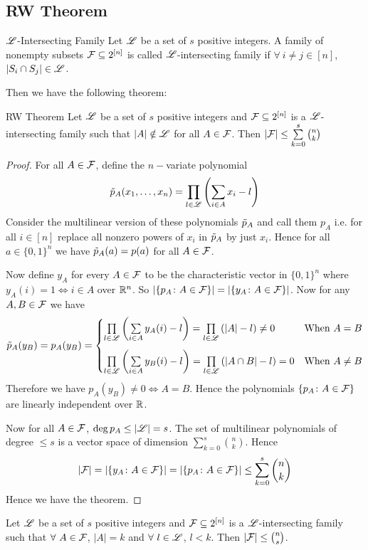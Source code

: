 \documentclass[twoside]{article}
\begin{document}
\subsection{RW Theorem}
\begin{Definition}{${\mathscr{L}}$-Intersecting Family}{}
	Let ${\mathscr{L}}$ be a set of $s$ positive integers. A family of nonempty subsets $\mathcal{F}\subseteq 2^{[n]}$ is called ${\mathscr{L}}$-intersecting family if $\forall\ i\neq j\in[n]$, $|S_i\cap S_j|\in {\mathscr{L}}$. 
\end{Definition}
Then we have the following theorem:
\begin{Theorem}{RW Theorem}{}
	Let ${\mathscr{L}}$ be a set of $s$ positive integers and $\mathcal{F}\subseteq 2^{[n]}$ is a ${\mathscr{L}}$-intersecting family such that $|A|\notin {\mathscr{L}}$ for all $A\in \mathcal{F}$. Then $|\mathcal{F}|\leq \sum\limits_{k=0}^s \binom{n}{k}$
\end{Theorem}
\begin{proof}
	For all $A\in\mathcal{F}$, define the $n-$variate polynomial $$\tilde{p}_A(x_1,\dots, x_n)=\prod\limits_{l\in{\mathscr{L}}}\left(\sum_{i\in A}x_i-l\right)$$Consider the multilinear version of these polynomials $\tilde{p}_A$ and call them $p_A$ i.e. for all $i\in [n]$ replace all nonzero powers of $x_i$ in $\tilde{p}_A$ by just $x_i$. Hence for all $a\in\{0,1\}^n$ we have $\tilde{p}_A(a)=p(a)$ for all $A\in\mathcal{F}$.
	
	
	Now define $y_A$ for every $A\in \mathcal{F}$ to be the characteristic vector in $\{0,1\}^n$ where $y_A(i)=1\iff i\in A$ over $\mathbb{R}^n$. So $|\{p_A\colon A\in\mathcal{F}\}|=|\{y_A\colon A\in\mathcal{F}\}|$. Now for any $A,B\in\mathcal{F}$ we have $$\tilde{p}_A(y_B)=p_A(y_B)=\begin{cases}
		\prod\limits_{l\in{\mathscr{L}}}\left(\sum\limits_{i\in A}y_A(i)-l\right)=\prod\limits_{l\in{\mathscr{L}}}\left(|A|-l\right)\neq 0 & \text{When }A=B\\[5mm]
		\prod\limits_{l\in{\mathscr{L}}}\left(\sum\limits_{i\in A}y_B(i)-l\right)=\prod\limits_{l\in{\mathscr{L}}}\left(|A\cap B|-l\right)=0 & \text{When }A\neq B
	\end{cases}$$Therefore we have $p_A(y_B)\neq0 \iff A=B$. Hence the polynomials $\{p_A\colon A\in\mathcal{F}\}$ are linearly independent over $\mathbb{R}$.
	
	Now for all $A\in\mathcal{F}$, $\deg p_A\leq |{\mathscr{L}}|=s$. The set of multilinear polynomials of degree $\leq s$ is a vector space of dimension $\sum\limits_{k=0}^s\binom{n}{k}$. Hence $$|\mathcal{F}|=|\{y_A\colon A\in\mathcal{F}\}|=|\{p_A\colon A\in \mathcal{F}\}|\leq \sum_{k=0}^s\binom{n}{k}$$Hence we have the theorem.
\end{proof}
\begin{lemma}{}{}
	Let ${\mathscr{L}}$ be a set of $s$ positive integers and $\mathcal{F}\subseteq 2^{[n]}$ is a ${\mathscr{L}}$-intersecting family such that $\forall\ A\in \mathcal{F}$, $|A|=k$ and $\forall\ l\in {\mathscr{L}}$, $l<k$. Then $|\mathcal{F}|\leq \binom{n}{s}$. 
\end{lemma}
\end{document}

